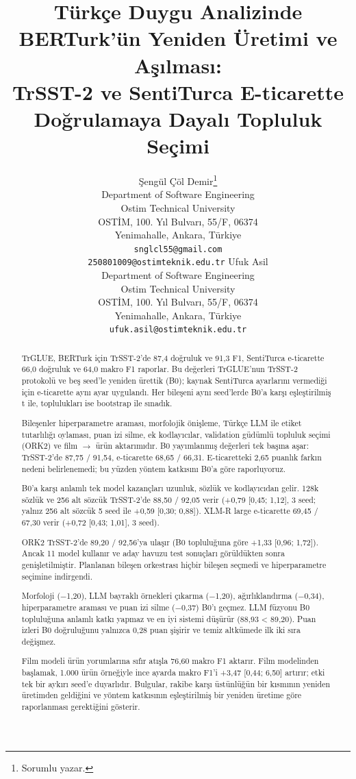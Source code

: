 \documentclass[11pt]{article}
\title{Türkçe Duygu Analizinde BERTurk'ün Yeniden Üretimi ve Aşılması:\\TrSST-2 ve SentiTurca E-ticarette Doğrulamaya Dayalı Topluluk Seçimi}
\author{Şengül Çöl Demir\thanks{Sorumlu yazar.} \\
  Department of Software Engineering \\
  Ostim Technical University \\
  OSTİM, 100. Yıl Bulvarı, 55/F, 06374 \\
  Yenimahalle, Ankara, Türkiye \\
  \texttt{snglcl55@gmail.com} \\
  \texttt{250801009@ostimteknik.edu.tr}
  \And
  Ufuk Asil \\
  Department of Software Engineering \\
  Ostim Technical University \\
  OSTİM, 100. Yıl Bulvarı, 55/F, 06374 \\
  Yenimahalle, Ankara, Türkiye \\
  \texttt{ufuk.asil@ostimteknik.edu.tr}}
\begin{document}
\maketitle
\begin{abstract}

TrGLUE, BERTurk için TrSST-2'de 87,4 doğruluk ve 91,3 F1, SentiTurca e-ticarette 66,0 doğruluk ve 64,0 makro F1 raporlar. Bu değerleri TrGLUE'nun TrSST-2 protokolü ve beş seed'le yeniden ürettik (B0); kaynak SentiTurca ayarlarını vermediği için e-ticarette aynı ayar uygulandı. Her bileşeni aynı seed'lerde B0'a karşı eşleştirilmiş t ile, toplulukları ise bootstrap ile sınadık.

Bileşenler hiperparametre araması, morfolojik önişleme, Türkçe LLM ile etiket tutarlılığı oylaması, puan izi silme, ek kodlayıcılar, validation güdümlü topluluk seçimi (ORK2) ve film $\rightarrow$ ürün aktarımıdır. B0 yayımlanmış değerleri tek başına aşar: TrSST-2'de 87,75 / 91,54, e-ticarette 68,65 / 66,31. E-ticaretteki 2,65 puanlık farkın nedeni belirlenemedi; bu yüzden yöntem katkısını B0'a göre raporluyoruz.

B0'a karşı anlamlı tek model kazançları uzunluk, sözlük ve kodlayıcıdan gelir. 128k sözlük ve 256 alt sözcük TrSST-2'de 88,50 / 92,05 verir (+0,79 [0,45; 1,12], 3 seed; yalnız 256 alt sözcük 5 seed ile +0,59 [0,30; 0,88]). XLM-R large e-ticarette 69,45 / 67,30 verir (+0,72 [0,43; 1,01], 3 seed).

ORK2 TrSST-2'de 89,20 / 92,56'ya ulaşır (B0 topluluğuna göre +1,33 [0,96; 1,72]). Ancak 11 model kullanır ve aday havuzu test sonuçları görüldükten sonra genişletilmiştir. Planlanan bileşen orkestrası hiçbir bileşen seçmedi ve hiperparametre seçimine indirgendi.

Morfoloji ($-$1,20), LLM bayraklı örnekleri çıkarma ($-$1,20), ağırlıklandırma ($-$0,34), hiperparametre araması ve puan izi silme ($-$0,37) B0'ı geçmez. LLM füzyonu B0 topluluğuna anlamlı katkı yapmaz ve en iyi sistemi düşürür (88,93 < 89,20). Puan izleri B0 doğruluğunu yalnızca 0,28 puan şişirir ve temiz altkümede ilk iki sıra değişmez.

Film modeli ürün yorumlarına sıfır atışla 76,60 makro F1 aktarır. Film modelinden başlamak, 1.000 ürün örneğiyle ince ayarda makro F1'i +3,47 [0,44; 6,50] artırır; etki tek bir aykırı seed'e duyarlıdır. Bulgular, rakibe karşı üstünlüğün bir kısmının yeniden üretimden geldiğini ve yöntem katkısının eşleştirilmiş bir yeniden üretime göre raporlanması gerektiğini gösterir.


\end{abstract}
\end{document}
